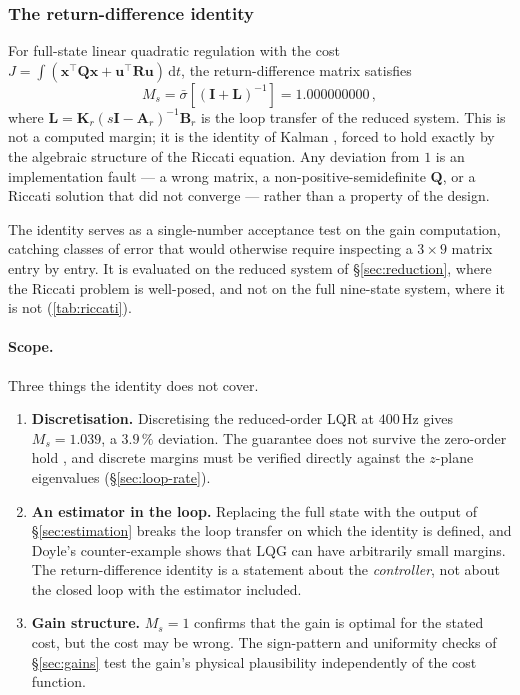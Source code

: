 \subsubsection{The return-difference identity}
\label{sec:return-difference}

For full-state linear quadratic regulation with the cost
$J = \int(\bm{x}^{\top}\bm{Q}\bm{x} + \bm{u}^{\top}\bm{R}\bm{u})\,
\mathrm{d}t$, the return-difference matrix satisfies
%
\begin{equation}
  M_s = \bar\sigma\!\left[(\bm{I} + \bm{L})^{-1}\right] = 1.000000000\,,
  \label{eq:Ms}
\end{equation}
%
where $\bm{L} = \bm{K}_r(s\bm{I} - \bm{A}_r)^{-1}\bm{B}_r$ is the loop
transfer of the reduced system. This is not a computed margin; it is the
identity of Kalman \cite{kalman1964optimal}, forced to hold exactly by the
algebraic structure of the Riccati equation. Any deviation from $1$ is an
implementation fault --- a wrong matrix, a non-positive-semidefinite $\bm{Q}$,
or a Riccati solution that did not converge --- rather than a property of the
design.

The identity serves as a single-number acceptance test on the gain
computation, catching classes of error that would otherwise require
inspecting a $3\times 9$ matrix entry by entry. It is evaluated on the
reduced system of \S\ref{sec:reduction}, where the Riccati problem is
well-posed, and not on the full nine-state system, where it is not
(\cref{tab:riccati}).

\paragraph{Scope.} Three things the identity does not cover.

\begin{enumerate}
  \item \textbf{Discretisation.} Discretising the reduced-order LQR at
        $400$\,Hz gives $M_s = 1.039$, a $3.9\,\%$ deviation. The guarantee
        does not survive the zero-order hold \cite{doyle1978guaranteed}, and
        discrete margins must be verified directly against the $z$-plane
        eigenvalues (\S\ref{sec:loop-rate}).
  \item \textbf{An estimator in the loop.} Replacing the full state with the
        output of \S\ref{sec:estimation} breaks the loop transfer on which
        the identity is defined, and Doyle's counter-example
        \cite{doyle1978guaranteed} shows that LQG can have arbitrarily small
        margins. The return-difference identity is a statement about the
        \emph{controller}, not about the closed loop with the estimator
        included.
  \item \textbf{Gain structure.} $M_s = 1$ confirms that the gain is optimal
        for the stated cost, but the cost may be wrong. The sign-pattern and
        uniformity checks of \S\ref{sec:gains} test the gain's physical
        plausibility independently of the cost function.
\end{enumerate}

